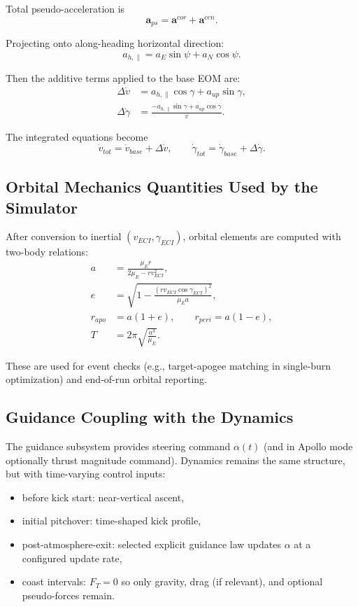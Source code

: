 Total pseudo-acceleration is
\begin{equation}
 \mathbf{a}_{ps} = \mathbf{a}^{cor}+\mathbf{a}^{cen}.
\end{equation}

Projecting onto along-heading horizontal direction:
\begin{equation}
 a_{h,\parallel} = a_E\sin\psi + a_N\cos\psi.
\end{equation}

Then the additive terms applied to the base EOM are:
\begin{align}
 \Delta\dot{v} &= a_{h,\parallel}\cos\gamma + a_{up}\sin\gamma, \\
 \Delta\dot{\gamma} &= \frac{-a_{h,\parallel}\sin\gamma + a_{up}\cos\gamma}{v}.
\end{align}

The integrated equations become
\begin{equation}
 \dot{v}_{tot}=\dot{v}_{base}+\Delta\dot{v}, \qquad
 \dot{\gamma}_{tot}=\dot{\gamma}_{base}+\Delta\dot{\gamma}.
\end{equation}

\subsection{Orbital Mechanics Quantities Used by the Simulator}

After conversion to inertial $(v_{ECI},\gamma_{ECI})$, orbital elements are computed with two-body relations:
\begin{align}
 a &= \frac{\mu_E r}{2\mu_E-r v_{ECI}^2}, \\
 e &= \sqrt{1-\frac{(r v_{ECI}\cos\gamma_{ECI})^2}{\mu_E a}}, \\
 r_{apo} &= a(1+e), \qquad r_{peri}=a(1-e), \\
 T &= 2\pi\sqrt{\frac{a^3}{\mu_E}}.
\end{align}

These are used for event checks (e.g., target-apogee matching in single-burn optimization) and end-of-run orbital reporting.

\subsection{Guidance Coupling with the Dynamics}

The guidance subsystem provides steering command $\alpha(t)$ (and in Apollo mode optionally thrust magnitude command). Dynamics remains the same structure, but with time-varying control inputs:
\begin{itemize}
\item before kick start: near-vertical ascent,
\item initial pitchover: time-shaped kick profile,
\item post-atmosphere-exit: selected explicit guidance law updates $\alpha$ at a configured update rate,
\item coast intervals: $F_T=0$ so only gravity, drag (if relevant), and optional pseudo-forces remain.
\end{itemize}

